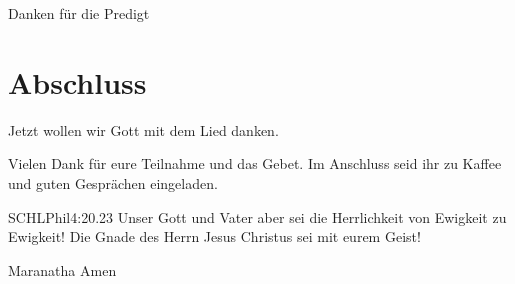 \documentclass{../inc/mybib}
\begin{document}
Danken für die Predigt

\section{Abschluss}

Jetzt wollen wir Gott mit dem Lied  danken.


Vielen Dank für eure Teilnahme und das Gebet. Im Anschluss seid ihr zu Kaffee und guten Gesprächen eingeladen.
\beten{}

\begin{bibeltext}{SCHL}{Phil}{4:20.23}
Unser Gott und Vater aber sei die Herrlichkeit von Ewigkeit zu Ewigkeit!
Die Gnade des Herrn Jesus Christus sei mit eurem Geist!
\end{bibeltext}

Maranatha Amen
\end{document}
